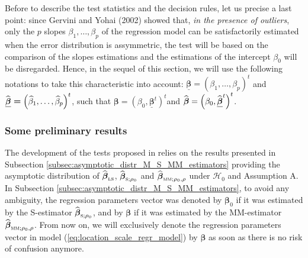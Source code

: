Before to describe the test statistics and the decision rules, let us precise
a last point: since Gervini and Yohai (2002) showed that, \emph{in the
presence of outliers}, only the $p$ slopes $\beta_{1},\ldots,\beta_{p}$ of the
regression model can be satisfactorily estimated when the error distribution
is assymmetric, the test will be based on the comparison of the slopes
estimations and the estimations of the intercept $\beta_{0}$ will be
disregarded. Hence, in the sequel of this section, we will use the following
notations to take this characteristic into account: $\boldsymbol{\underline
{\boldsymbol\beta}=}\left(  \beta_{1},\ldots,\beta_{p}\right)  ^{t}$ and
$\boldsymbol{\underline{\sthat{\boldsymbol\beta}}=}\left(  \sthat{\beta
}_{1},\ldots,\sthat{\beta}_{p}\right)  ^{t}$, such that $\boldsymbol{\beta
}=\left(  \beta_{0},\boldsymbol{\underline{\boldsymbol\beta}}^{t}\right)
^{t}$and $\sthat{\boldsymbol\beta}=\left(  \beta_{0}%
,\boldsymbol{\underline{\sthat{\boldsymbol\beta}}}^{t}\right)  ^{t}$.

\subsubsection{Some preliminary results}

The development of the tests proposed in \citet{Dehon:2012}
relies on the results presented in Subsection
\ref{subsec:asymptotic_distr_M_S_MM_estimators} providing the asymptotic
distribution of $\sthat{\boldsymbol\beta}_{\stsc{LS}}$, $\widehat
{\boldsymbol\beta}_{\stsc{S};\rho_{0}}$ and $\sthat{\boldsymbol\beta%
}_{\stsc{MM};\rho_{0},\rho}$ under $\mathcal{H}_{0}$ and Assumption A. In
Subsection \ref{subsec:asymptotic_distr_M_S_MM_estimators}, to avoid any
ambiguity, the regression parameters vector was denoted by $\boldsymbol{\beta
}_{0}$ if it was estimated by the S-estimator $\sthat{\boldsymbol\beta%
}_{\stsc{S};\rho_{0}}$, and by $\boldsymbol\beta$ if it was estimated by
the MM-estimator $\sthat{\boldsymbol\beta}_{\stsc{MM};\rho_{0},\rho}$.
From now on, we will exclusively denote the regression parameters vector in
model (\ref{eq:location_scale_regr_model}) by $\boldsymbol\beta$ as soon as
there is no risk of confusion anymore.

